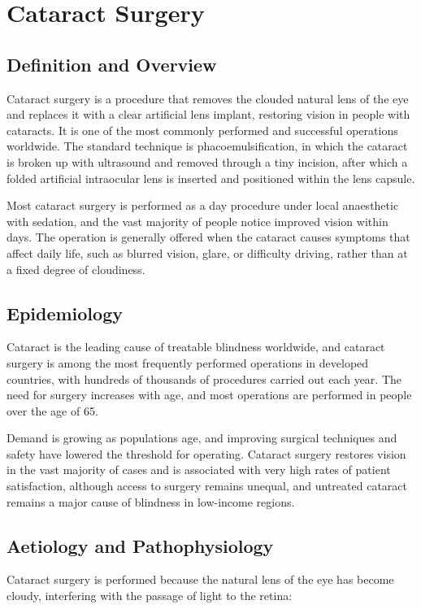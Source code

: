 \chapter{Cataract Surgery}

\section*{Definition and Overview}
Cataract surgery is a procedure that removes the clouded natural lens of the eye and replaces it with a clear artificial lens implant, restoring vision in people with cataracts. It is one of the most commonly performed and successful operations worldwide. The standard technique is phacoemulsification, in which the cataract is broken up with ultrasound and removed through a tiny incision, after which a folded artificial intraocular lens is inserted and positioned within the lens capsule.

Most cataract surgery is performed as a day procedure under local anaesthetic with sedation, and the vast majority of people notice improved vision within days. The operation is generally offered when the cataract causes symptoms that affect daily life, such as blurred vision, glare, or difficulty driving, rather than at a fixed degree of cloudiness.

\section*{Epidemiology}
Cataract is the leading cause of treatable blindness worldwide, and cataract surgery is among the most frequently performed operations in developed countries, with hundreds of thousands of procedures carried out each year. The need for surgery increases with age, and most operations are performed in people over the age of 65.

Demand is growing as populations age, and improving surgical techniques and safety have lowered the threshold for operating. Cataract surgery restores vision in the vast majority of cases and is associated with very high rates of patient satisfaction, although access to surgery remains unequal, and untreated cataract remains a major cause of blindness in low-income regions.

\section*{Aetiology and Pathophysiology}
Cataract surgery is performed because the natural lens of the eye has become cloudy, interfering with the passage of light to the retina:

